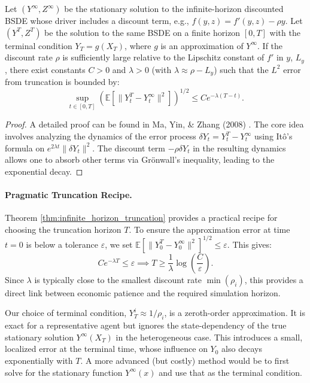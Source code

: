 \begin{theorem}
\label{thm:infinite_horizon_truncation}
Let $(Y^\infty, Z^\infty)$ be the stationary solution to the infinite-horizon discounted BSDE whose driver includes a discount term, e.g., $f(y,z) = f'(y,z) - \rho y$. Let $(Y^T, Z^T)$ be the solution to the same BSDE on a finite horizon $[0, T]$ with the terminal condition $Y_T = g(X_T)$, where $g$ is an approximation of $Y^\infty$. If the discount rate $\rho$ is sufficiently large relative to the Lipschitz constant of $f'$ in $y$, $L_y$, there exist constants $C > 0$ and $\lambda > 0$ (with $\lambda \approx \rho - L_y$) such that the $L^2$ error from truncation is bounded by:
\[
\sup_{t \in [0,T]} \left( \mathbb{E}\left[ \|Y_t^T - Y_t^\infty\|^2 \right] \right)^{1/2} \le C e^{-\lambda(T-t)}.
\]
\end{theorem}
\begin{proof}
A detailed proof can be found in Ma, Yin, \& Zhang (2008) \cite{MaYinZhang2008}. The core idea involves analyzing the dynamics of the error process $\delta Y_t = Y_t^T - Y_t^\infty$ using Itô's formula on $e^{2\lambda t}\|\delta Y_t\|^2$. The discount term $-\rho \delta Y_t$ in the resulting dynamics allows one to absorb other terms via Grönwall's inequality, leading to the exponential decay.
\end{proof}

\paragraph{Pragmatic Truncation Recipe.} Theorem \ref{thm:infinite_horizon_truncation} provides a practical recipe for choosing the truncation horizon $T$. To ensure the approximation error at time $t=0$ is below a tolerance $\varepsilon$, we set $\mathbb{E}[\|Y_0^T - Y_0^\infty\|^2]^{1/2} \le \varepsilon$. This gives:
\begin{equation}
C e^{-\lambda T} \le \varepsilon \implies T \ge \frac{1}{\lambda} \log\left(\frac{C}{\varepsilon}\right).
\end{equation}
Since $\lambda$ is typically close to the smallest discount rate $\min(\rho_i)$, this provides a direct link between economic patience and the required simulation horizon.

\begin{remark}
Our choice of terminal condition, $Y^i_T \approx 1/\rho_i$, is a zeroth-order approximation. It is exact for a representative agent but ignores the state-dependency of the true stationary solution $Y^\infty(X_T)$ in the heterogeneous case. This introduces a small, localized error at the terminal time, whose influence on $Y_0$ also decays exponentially with $T$. A more advanced (but costly) method would be to first solve for the stationary function $Y^\infty(x)$ and use that as the terminal condition.
\end{remark}


